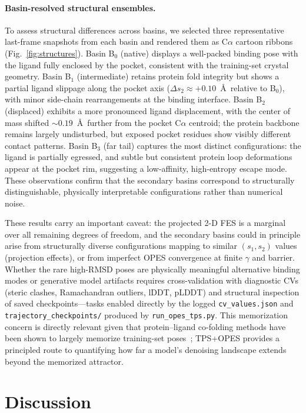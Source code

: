 \documentclass[aps,prl,twocolumn,superscriptaddress,floatfix]{revtex4-2}
\begin{document}
\paragraph{Basin-resolved structural ensembles.}
To assess structural differences across basins, we selected three
representative last-frame snapshots from each basin and rendered them as
C$\alpha$ cartoon ribbons (Fig.~\ref{fig:structures}).  Basin B$_0$
(native) displays a well-packed binding pose with the ligand fully
enclosed by the pocket, consistent with the training-set crystal geometry.
Basin B$_1$ (intermediate) retains protein fold integrity but shows a
partial ligand slippage along the pocket axis ($\Delta s_2 \approx
+0.10$~\AA\ relative to B$_0$), with minor side-chain rearrangements at
the binding interface.  Basin B$_2$ (displaced) exhibits a more
pronounced ligand displacement, with the center of mass shifted $\sim
0.19$~\AA\ further from the pocket C$\alpha$ centroid; the protein
backbone remains largely undisturbed, but exposed pocket residues show
visibly different contact patterns.  Basin B$_3$ (far tail) captures the
most distinct configurations: the ligand is partially egressed, and
subtle but consistent protein loop deformations appear at the pocket rim,
suggesting a low-affinity, high-entropy escape mode.  These observations
confirm that the secondary basins correspond to structurally
distinguishable, physically interpretable configurations rather than
numerical noise.

These results carry an important caveat: the projected 2-D FES is a marginal
over all remaining degrees of freedom, and the secondary basins could in
principle arise from structurally diverse configurations mapping to similar
$(s_1, s_2)$ values (projection effects), or from imperfect OPES convergence
at finite $\gamma$ and barrier.  Whether the rare high-RMSD poses are
physically meaningful alternative binding modes or generative model artifacts
requires cross-validation with diagnostic CVs (steric clashes, Ramachandran
outliers, lDDT, pLDDT) and structural inspection of saved
checkpoints---tasks enabled directly by the logged \texttt{cv\_values.json}
and \texttt{trajectory\_checkpoints/} produced by \texttt{run\_opes\_tps.py}.
This memorization concern is directly relevant given that protein--ligand
co-folding methods have been shown to largely memorize training-set
poses~\cite{skrinjar2025}; TPS+OPES provides a principled route to
quantifying how far a model's denoising landscape extends beyond the
memorized attractor.

\section{Discussion}
\end{document}
